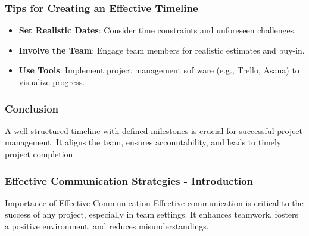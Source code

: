 \documentclass{beamer}
\begin{document}
\begin{frame}[fragile]
    \frametitle{Tips for Creating an Effective Timeline}
    \begin{itemize}
        \item \textbf{Set Realistic Dates}: Consider time constraints and unforeseen challenges.
        \item \textbf{Involve the Team}: Engage team members for realistic estimates and buy-in.
        \item \textbf{Use Tools}: Implement project management software (e.g., Trello, Asana) to visualize progress.
    \end{itemize}
\end{frame}

\begin{frame}[fragile]
    \frametitle{Conclusion}
    A well-structured timeline with defined milestones is crucial for successful project management. It aligns the team, ensures accountability, and leads to timely project completion.
\end{frame}

\begin{frame}[fragile]
    \frametitle{Effective Communication Strategies - Introduction}
    \begin{block}{Importance of Effective Communication}
        Effective communication is critical to the success of any project, especially in team settings. It enhances teamwork, fosters a positive environment, and reduces misunderstandings.
    \end{block}
\end{frame}
\end{document}
